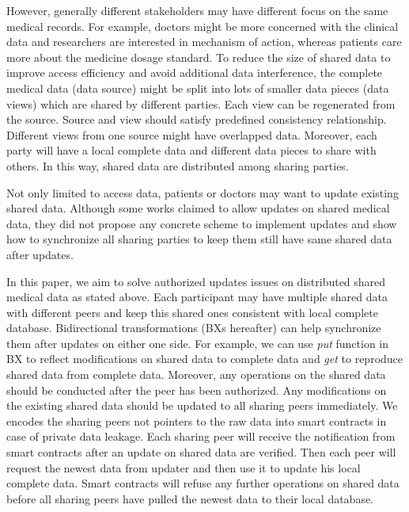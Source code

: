 \documentclass[conference]{IEEEtran}
\begin{document}
However, generally different stakeholders may have different focus on the same medical records. For example, doctors might be more concerned with the clinical data and researchers are interested in mechanism of action, whereas patients care more about the medicine dosage standard. To reduce the size of shared data to improve access efficiency and avoid additional data interference, the complete medical data (data source) might be split into lots of smaller data pieces (data views) which are shared by different parties. Each view can be regenerated from the source. Source and view should satisfy predefined consistency relationship. Different views from one source might have overlapped data. Moreover, each party will have a local complete data and different data pieces to share with others. In this way, shared data are distributed among sharing parties.

Not only limited to access data, patients or doctors may want to update existing shared data. Although some works \cite{azaria2016medrec} claimed to allow updates on shared medical data, they did not propose any concrete scheme to implement updates and show how to synchronize all sharing parties to keep them still have same shared data after updates.

In this paper, we aim to solve authorized updates issues on distributed shared medical data as stated above. 
Each participant may have multiple shared data with different peers and keep this shared ones consistent with local complete database. Bidirectional transformations \cite{hu2014validity} (BXs hereafter) can help synchronize them after updates on either one side. For example, we can use \emph{put} function in BX to reflect modifications on shared data to complete data and \emph{get} to reproduce shared data from complete data. 
Moreover,  any operations on the shared data should be conducted after the peer has been authorized. Any modifications on the existing shared data should be updated to all sharing peers immediately. We encodes the sharing peers not pointers to the raw data into smart contracts in case of private data leakage. Each sharing peer will receive the notification from smart contracts after an update on shared data are verified. Then each peer will request the newest data from updater and then use it to update his local complete data. Smart contracts will refuse any further operations on shared data before all sharing peers have pulled the newest data to their local database.
\end{document}
